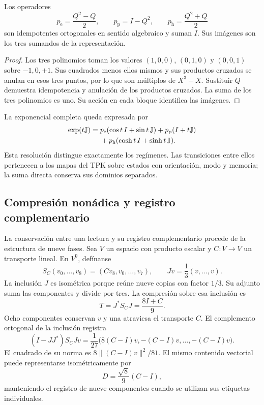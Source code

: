 \begin{proposicion}
\label{eul:prop:proyectores}
Los operadores
\[
 p_{\mathrm e}=\frac{Q^2-Q}{2},\qquad
 p_{\mathrm p}=I-Q^2,\qquad
 p_{\mathrm h}=\frac{Q^2+Q}{2}
\]
son idempotentes ortogonales en sentido algebraico y suman \(I\).
Sus imágenes son los tres sumandos de la representación.
\end{proposicion}
\begin{proof}
Los tres polinomios toman los valores \((1,0,0)\), \((0,1,0)\) y
\((0,0,1)\) sobre \(-1,0,+1\). Sus cuadrados menos ellos mismos y
sus productos cruzados se anulan en esos tres puntos, por lo que son
múltiplos de \(X^3-X\). Sustituir \(Q\) demuestra idempotencia y
anulación de los productos cruzados. La suma de los tres polinomios
es uno. Su acción en cada bloque identifica las imágenes.
\end{proof}

La exponencial completa queda expresada por
\begin{align}
 \exp(t\mathbb J)={}&p_{\mathrm e}(\cos t\,I+\sin t\,\mathbb J)
 +p_{\mathrm p}(I+t\mathbb J)\notag\\
 &+p_{\mathrm h}(\cosh t\,I+\sinh t\,\mathbb J).
\end{align}
Esta resolución distingue exactamente los regímenes. Las transiciones
entre ellos pertenecen a los mapas del TPK sobre estados con orientación,
modo y memoria; la suma directa conserva sus dominios separados.

\subsection{Compresión nonádica y registro complementario}
\label{eul:compresion}

La conservación entre una lectura y su registro complementario procede
de la estructura de nueve fases. Sea \(V\) un espacio con producto
escalar y \(C:V\to V\) un transporte lineal. En \(V^9\), defínanse
\[
 S_C(v_0,\ldots,v_8)=(Cv_8,v_0,\ldots,v_7),
 \qquad Jv=\frac13(v,\ldots,v).
\]
La inclusión \(J\) es isométrica porque reúne nueve copias con factor
\(1/3\). Su adjunto suma las componentes y divide por tres. La
compresión sobre esa inclusión es
\[
 T=J^*S_CJ=\frac{8I+C}{9}.
\]
Ocho componentes conservan \(v\) y una atraviesa el transporte \(C\).
El complemento ortogonal de la inclusión registra
\[
 (I-JJ^*)S_CJv
 =\frac1{27}\bigl(8(C-I)v,-(C-I)v,\ldots,-(C-I)v\bigr).
\]
El cuadrado de su norma es
\(8\|(C-I)v\|^2/81\). El mismo contenido vectorial puede representarse
isométricamente por
\[
 D=\frac{\sqrt8}{9}(C-I),
\]
manteniendo el registro de nueve componentes cuando se utilizan sus
etiquetas individuales.

